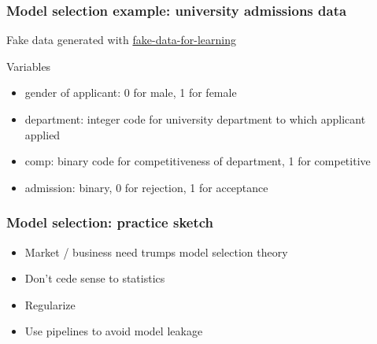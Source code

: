 \begin{frame}
\frametitle{Model selection example: university admissions data}
Fake data generated with \href{https://github.com/munichpavel/fake-data-for-learning}{fake-data-for-learning}\newline

 \newline

 Variables
\begin{itemize}
\item gender of applicant: 0 for male, 1 for female
\item department: integer code for university department to which applicant applied
\item comp: binary code for competitiveness of department, 1 for competitive
\item admission: binary, 0 for rejection, 1 for acceptance
\end{itemize}
\end{frame}


\begin{frame}
  \frametitle{Model selection: practice sketch}

  \begin{itemize}
    \item Market / business need trumps model selection theory
    \item Don't cede sense to statistics
    \item Regularize
    \item Use pipelines to avoid model leakage
  \end{itemize}
\end{frame}

